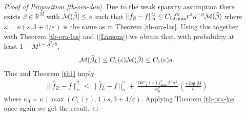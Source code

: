 \documentclass[dvips,aos]{imsart}
\numberwithin{equation}{section}
\theoremstyle{plain}
\def\sf{}
\def\wideth{\widehat}
\def\scm{{\cal M}}
\def\wh{\widehat}
\def\eps{\varepsilon}
\def\RR{\mathbb R}
\begin{document}
\begin{proof}[Proof of Proposition \ref{th-ora-dan}] Due to the weak sparsity assumption there
exists $\bar \beta\in\RR^M$ with $\scm(\bar \beta)\le s$ such that
$\| {\sf f}_{\bar \beta} - f\|_n^2 \le {C_0
f_{\max}^2r^2}\kappa^{-2}\scm(\bar \beta)$ where $\kappa=\kappa(s,
3+4/\eps)$ is the same as in Theorem \ref{th-ora-las}. Using this
together with Theorem \ref{th-ora-las} and (\ref{Lassom}) we obtain
that, with probability at least $1-M^{1-A^2/8}$,
 \begin{eqnarray*}
\scm(\wh \beta_L) \le C_1(\eps)\scm(\bar \beta) \le C_1(\eps) s.
\end{eqnarray*}
This and Theorem \ref{th1} imply
 \begin{eqnarray*}
\| \wideth f_D -f\|_n^2 \le \| \wideth{f}_L -f\|_n ^2 + \,\frac{
16C_1(\eps) f_{\max}^2 A^2 \sigma^2}{\kappa_0^2}\, \left(\frac{s\log
M}{n}\right)\,
\end{eqnarray*}
where $\kappa_0= \kappa(\max (C_1(\eps),1)s, 3+4/\eps)$. Applying
Theorem \ref{th-ora-las} once again we get the result.
\end{proof}

\end{document}
